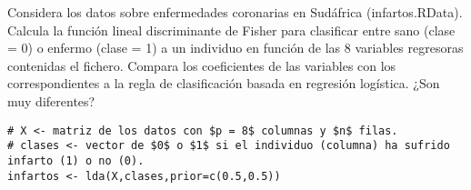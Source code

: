 \begin{problem}[2]
Considera los datos sobre enfermedades coronarias en Sudáfrica (infartos.RData). Calcula la
función lineal discriminante de Fisher para clasificar entre sano (clase = 0) o enfermo (clase = 1) a
un individuo en función de las 8 variables regresoras contenidas el fichero. Compara los coeficientes
de las variables con los correspondientes a la regla de clasificación basada en regresión logística.
¿Son muy diferentes?
\solution

\begin{lstlisting}[style=mystyle]
# X <- matriz de los datos con $p = 8$ columnas y $n$ filas.
# clases <- vector de $0$ o $1$ si el individuo (columna) ha sufrido infarto (1) o no (0).
infartos <- lda(X,clases,prior=c(0.5,0.5))
\end{lstlisting}


\end{problem}


